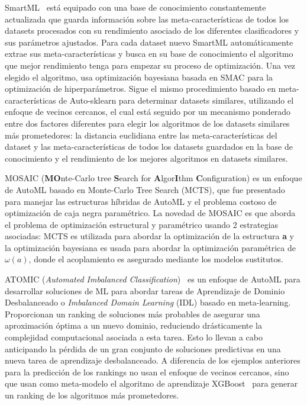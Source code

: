 \documentclass[a4paper,10pt,twocolumn]{article}
\begin{document}
SmartML~\cite{maher2019smartml} está equipado con una base de conocimiento constantemente actualizada que guarda información sobre las meta-características de todos los datasets procesados con su rendimiento asociado de los diferentes clasificadores y sus parámetros ajustados. Para cada dataset nuevo SmartML automáticamente extrae sus meta-características y busca en su base de conocimiento el algoritmo que mejor rendimiento tenga para empezar su proceso de optimización. Una vez elegido el algoritmo, usa optimización bayesiana basada en SMAC para la optimización de hiperparámetros. Sigue el mismo procedimiento basado en meta-características de Auto-sklearn para determinar datasets similares, utilizando el enfoque de vecinos cercanos, el cual está seguido por un mecanismo ponderado entre dos factores diferentes para elegir los algoritmos de los datasets similares más prometedores: la distancia euclidiana entre las meta-características del dataset y las meta-características de todos los datasets guardados en la base de conocimiento y el rendimiento de los mejores algoritmos en datasets similares.

MOSAIC (\textbf{MO}nte-Carlo tree \textbf{S}earch for \textbf{A}lgor\textbf{I}thm \textbf{C}onfiguration) \cite{rakotoarison2019automated} es un enfoque de AutoML basado en Monte-Carlo Tree Search (MCTS), que fue presentado para manejar las estructuras híbridas de AutoML y el problema costoso de optimización de caja negra paramétrico. La novedad de MOSAIC es que aborda el problema de optimización estructural y paramétrico usando 2 estrategias asociadas: MCTS es utilizada para abordar la optimización de la estructura \textbf{a} y la optimización bayesiana es usada para abordar la optimización paramétrica de $\omega(a)$, donde el acoplamiento es asegurado mediante los modelos sustitutos.

ATOMIC (\textit{Automated Imbalanced Classification})~\cite{atomic} es un enfoque de AutoML para desarrollar soluciones de ML para abordar tareas de Aprendizaje de Dominio Desbalanceado o \textit{Imbalanced Domain Learning} (IDL) basado en meta-learning. Proporcionan un ranking de soluciones más probables de asegurar una aproximación óptima a un nuevo dominio, reduciendo drásticamente la complejidad computacional asociada a esta tarea. Esto lo llevan a cabo anticipando la pérdida de un gran conjunto de soluciones predictivas en una nueva tarea de aprendizaje desbalanceado. A diferencia de los ejemplos anteriores para la predicción de los rankings no usan el enfoque de vecinos cercanos, sino que usan como meta-modelo el algoritmo de aprendizaje XGBoost~\cite{xgboost} para generar un ranking de los algoritmos más prometedores. 
\end{document}
